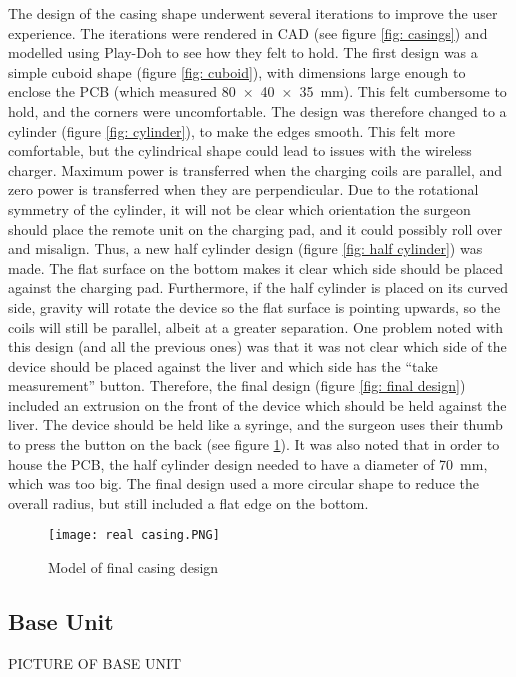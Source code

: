 The design of the casing shape underwent several iterations to improve the user experience. The iterations were rendered in CAD (see figure \ref{fig: casings}) and modelled using Play-Doh to see how they felt to hold. The first design was a simple cuboid shape (figure \ref{fig: cuboid}), with dimensions large enough to enclose the PCB (which measured \SI{80x40x35}{\milli\metre}). This felt cumbersome to hold, and the corners were uncomfortable. The design was therefore changed to a cylinder (figure \ref{fig: cylinder}), to make the edges smooth. This felt more comfortable, but the cylindrical shape could lead to issues with the wireless charger. Maximum power is transferred when the charging coils are parallel, and zero power is transferred when they are perpendicular. Due to the rotational symmetry of the cylinder, it will not be clear which orientation the surgeon should place the remote unit on the charging pad, and it could possibly roll over and misalign. Thus, a new half cylinder design (figure \ref{fig: half cylinder}) was made. The flat surface on the bottom makes it clear which side should be placed against the charging pad. Furthermore, if the half cylinder is placed on its curved side, gravity will rotate the device so the flat surface is pointing upwards, so the coils will still be parallel, albeit at a greater separation. One problem noted with this design (and all the previous ones) was that it was not clear which side of the device should be placed against the liver and which side has the ``take measurement'' button. Therefore, the final design (figure \ref{fig: final design}) included an extrusion on the front of the device which should be held against the liver. The device should be held like a syringe, and the surgeon uses their thumb to press the button on the back (see figure \ref{fig: real casing}). It was also noted that in order to house the PCB, the half cylinder design needed to have a diameter of \SI{70}{\milli\metre}, which was too big. The final design used a more circular shape to reduce the overall radius, but still included a flat edge on the bottom. \\

\begin{figure}[htb]
	\centering
	\texttt{[image: real casing.PNG]}
	\caption{Model of final casing design}
	\label{fig: real casing}
\end{figure}





\subsection{Base Unit}\label{base casing}
PICTURE OF BASE UNIT\\

